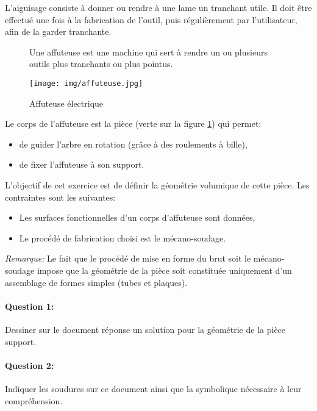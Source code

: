 L'aiguisage consiste à donner ou rendre à une lame un tranchant utile. Il doit être effectué une fois à la fabrication de l'outil, puis régulièrement par l'utilisateur, afin de la garder tranchante.

\begin{figure}[!h]
 \begin{minipage}{0.45\linewidth}
Une affuteuse est une machine qui sert à rendre un ou plusieurs outils plus tranchants ou plus pointus.
\end{minipage}
\hfill
 \begin{minipage}{0.5\linewidth}
  \centering\texttt{[image: img/affuteuse.jpg]}
  \caption{Affuteuse électrique}
  \label{img:image4}
 \end{minipage}
\end{figure}

Le corps de l'affuteuse est la pièce (verte sur la figure \ref{img:image4}) qui permet:
\begin{itemize}
 \item de guider l'arbre en rotation (grâce à des roulements à bille),
 \item de fixer l'affuteuse à son support. 
\end{itemize}

L'objectif de cet exercice est de définir la géométrie volumique de cette pièce. Les contraintes sont les suivantes:
\begin{itemize}
 \item Les surfaces fonctionnelles d'un corps d'affuteuse sont données,
 \item Le procédé de fabrication choisi est le mécano-soudage.
\end{itemize}

\textit{Remarque:} Le fait que le procédé de mise en forme du brut soit le mécano-soudage impose que la géométrie de la pièce soit constituée uniquement d'un assemblage de formes simples (tubes et plaques).

\paragraph{Question 1:} Dessiner sur le document réponse un solution pour la géométrie de la pièce support.

\paragraph{Question 2:} Indiquer les soudures sur ce document ainsi que la symbolique nécessaire à leur compréhension.

